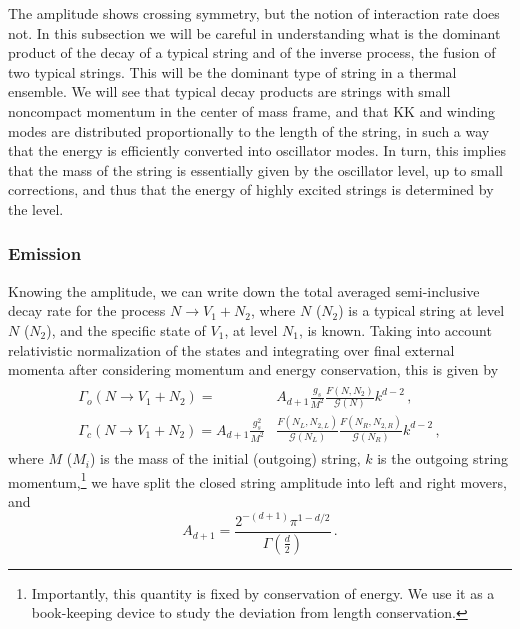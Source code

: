 \documentclass[a4paper,11pt]{article}
\newcommand{\lr}[1]{\left(#1\right)}
\begin{document}
The amplitude shows crossing symmetry, but the notion of interaction rate does not.
In this subsection we will be careful in understanding what is the dominant product of the decay of a typical string and of the inverse process, the fusion of two typical strings.
This will be the dominant type of string in a thermal ensemble.
We will see that typical decay products are strings with small noncompact momentum in the center of mass frame, and that KK and winding modes are distributed proportionally to the length of the string, in such a way that the energy is efficiently converted into oscillator modes.
In turn, this implies that the mass of the string is essentially given by the oscillator level, up to small corrections, and thus that the energy of highly excited strings is determined by the level. 

\subsubsection*{Emission}

Knowing the amplitude, we can write down the total averaged semi-inclusive decay rate for the process $N\rightarrow V_1+N_2$, where $N$ ($N_2$) is a typical string at level $N$ ($N_2$), and the specific state of $V_1$, at level $N_1$, is known.
Taking into account relativistic normalization of the states and integrating over final external momenta after considering momentum and energy conservation, this is given by
\begin{gather}\label{eq:particular-rate}
\begin{split}
    \Gamma_o\lr{N \rightarrow V_1+N_2}=& A_{d+1} \frac{g_s}{M^2}\frac{F(N,N_2)}{\mathcal{G}(N)}k^{d-2} \, , \\
    \Gamma_{c}\lr{N \rightarrow V_1+N_2}=A_{d+1} \frac{g_s^2}{M^2} &\frac{F(N_L,N_{2,L})}{\mathcal{G}(N_L)}\frac{F(N_R,N_{2,R})}{\mathcal{G}(N_R)}k^{d-2} \, ,
\end{split}
\end{gather}
where $M$ ($M_i$) is the mass of the initial (outgoing) string, $k$ is the outgoing string
momentum,\footnote{Importantly, this quantity is fixed by conservation of energy. We use it as a book-keeping device to study the deviation from length conservation.} we have split the closed string amplitude into left and right movers, and 
\begin{equation}
    A_{d+1}=\frac{2^{-(d+1)}\pi^{1-d/2}}{\Gamma\lr{\frac{d}{2}}}\, .
\end{equation}
\end{document}

